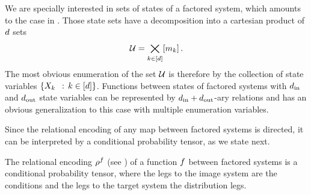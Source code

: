 We are specially interested in sets of states of a factored system, which amounts to the case in .
Those state sets have a decomposition into a cartesian product of $d$ sets
	\[ \mathcal{U} = \bigtimes_{k\in[d]}[m_{k}] \, . \]
The most obvious enumeration of the set $\mathcal{U}$ is therefore by the collection of state variables $\{\catvariableof{\atomenumerator} \, : \, \atomenumeratorin \}$.
Functions between states of factored systems with $d_{\mathrm{in}}$ and $d_{\mathrm{out}}$ state variables can be represented by $d_{\mathrm{in}}+d_{\mathrm{out}}$-ary relations and  has an obvious generalization to this case with multiple enumeration variables.


Since the relational encoding of any map between factored systems is directed, it can be interpreted by a conditional probability tensor, as we state next.

\begin{corollary}%
	The relational encoding $\rho^{f}$ (see ) of a function $f$ between factored systems is a conditional probability tensor, where the legs to the image system are the conditions and the legs to the target system the distribution legs.
\end{corollary}


